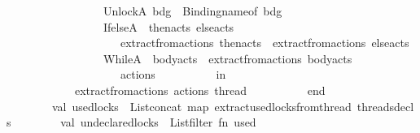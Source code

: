 \begin{isabellebody}
\ \ \ \ \ \ \ \ \ \ \ \ \ \ \ \ {\isacharbar}{\kern0pt}\ UnlockA\ bdg\ {\isacharequal}{\kern0pt}{\isachargreater}{\kern0pt}\ {\isacharbrackleft}{\kern0pt}Binding{\isachardot}{\kern0pt}name{\isacharunderscore}{\kern0pt}of\ bdg{\isacharbrackright}{\kern0pt}\isanewline
\ \ \ \ \ \ \ \ \ \ \ \ \ \ \ \ {\isacharbar}{\kern0pt}\ IfelseA\ {\isacharparenleft}{\kern0pt}{\isacharparenleft}{\kern0pt}{\isacharunderscore}{\kern0pt}{\isacharcomma}{\kern0pt}\ then{\isacharunderscore}{\kern0pt}acts{\isacharparenright}{\kern0pt}{\isacharcomma}{\kern0pt}\ else{\isacharunderscore}{\kern0pt}acts{\isacharparenright}{\kern0pt}\ {\isacharequal}{\kern0pt}{\isachargreater}{\kern0pt}\isanewline
\ \ \ \ \ \ \ \ \ \ \ \ \ \ \ \ \ \ \ \ extract{\isacharunderscore}{\kern0pt}from{\isacharunderscore}{\kern0pt}actions\ then{\isacharunderscore}{\kern0pt}acts\ {\isacharat}{\kern0pt}\ extract{\isacharunderscore}{\kern0pt}from{\isacharunderscore}{\kern0pt}actions\ else{\isacharunderscore}{\kern0pt}acts\isanewline
\ \ \ \ \ \ \ \ \ \ \ \ \ \ \ \ {\isacharbar}{\kern0pt}\ WhileA\ {\isacharparenleft}{\kern0pt}{\isacharunderscore}{\kern0pt}{\isacharcomma}{\kern0pt}\ body{\isacharunderscore}{\kern0pt}acts{\isacharparenright}{\kern0pt}\ {\isacharequal}{\kern0pt}{\isachargreater}{\kern0pt}\ extract{\isacharunderscore}{\kern0pt}from{\isacharunderscore}{\kern0pt}actions\ body{\isacharunderscore}{\kern0pt}acts\isanewline
\ \ \ \ \ \ \ \ \ \ \ \ \ \ \ \ {\isacharbar}{\kern0pt}\ {\isacharunderscore}{\kern0pt}\ {\isacharequal}{\kern0pt}{\isachargreater}{\kern0pt}\ {\isacharbrackleft}{\kern0pt}{\isacharbrackright}{\kern0pt}{\isacharparenright}{\kern0pt}\ actions{\isacharparenright}{\kern0pt}\isanewline
\ \ \ \ \ \ \ \ \ \ in\isanewline
\ \ \ \ \ \ \ \ \ \ \ \ extract{\isacharunderscore}{\kern0pt}from{\isacharunderscore}{\kern0pt}actions\ {\isacharparenleft}{\kern0pt}{\isacharhash}{\kern0pt}actions\ thread{\isacharparenright}{\kern0pt}\isanewline
\ \ \ \ \ \ \ \ \ \ end\isanewline
\ \ \ \ \ \ \ \ \isanewline
\ \ \ \ \ \ \ \ val\ used{\isacharunderscore}{\kern0pt}locks\ {\isacharequal}{\kern0pt}\ List{\isachardot}{\kern0pt}concat\ {\isacharparenleft}{\kern0pt}map\ extract{\isacharunderscore}{\kern0pt}used{\isacharunderscore}{\kern0pt}locks{\isacharunderscore}{\kern0pt}from{\isacharunderscore}{\kern0pt}thread\ threads{\isacharunderscore}{\kern0pt}decls{\isacharparenright}{\kern0pt}\isanewline
\ \ \ \ \ \ \ \ val\ undeclared{\isacharunderscore}{\kern0pt}locks\ {\isacharequal}{\kern0pt}\ List{\isachardot}{\kern0pt}filter\ {\isacharparenleft}{\kern0pt}fn\ used\ {\isacharequal}{\kern0pt}{\isachargreater}{\kern0pt}\ \isanewline

\end{isabellebody}
